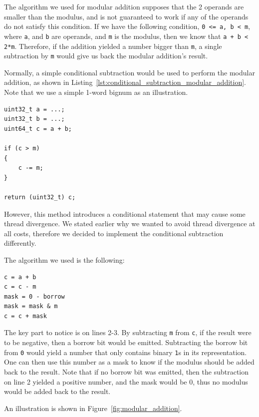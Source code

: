 \documentclass[12pt, a4paper]{report}
\begin{document}
The algorithm we used for modular addition supposes that the 2 operands are
smaller than the modulus, and is not guaranteed to work if any of the operands
do not satisfy this condition.
If we have the following condition, \verb+0 <= a, b < m+, where \verb+a+,
and \verb+b+ are operands, and \verb+m+ is the modulus, then we know that
\verb!a + b < 2*m!.
Therefore, if the addition yielded a number bigger than \verb+m+, a single
subtraction by \verb+m+ would give us back the modular addition's result.

Normally, a simple conditional subtraction would be used to perform the modular
addition, as shown in
Listing~\ref{lst:conditional_subtraction_modular_addition}.
Note that we use a simple 1-word bignum as an illustration.

\begin{lstlisting}
uint32_t a = ...;
uint32_t b = ...;
uint64_t c = a + b;

if (c > m)
{
    c -= m;
}

return (uint32_t) c;
\end{lstlisting}

However, this method introduces a conditional statement that may cause some
thread divergence.
We stated earlier why we wanted to avoid thread divergence at all costs,
therefore we decided to implement the conditional subtraction differently.

The algorithm we used is the following:
\begin{lstlisting}
c = a + b
c = c - m
mask = 0 - borrow
mask = mask & m
c = c + mask
\end{lstlisting}

The key part to notice is on lines 2-3.
By subtracting \verb+m+ from \verb+c+, if the result were to be negative, then
a borrow bit would be emitted.
Subtracting the borrow bit from \verb+0+ would yield a number that only contains
binary \verb+1+s in its representation.
One can then use this number as a mask to know if the modulus should be added
back to the result.
Note that if no borrow bit was emitted, then the subtraction on line 2 yielded a
positive number, and the mask would be 0, thus no modulus would be added back to
the result.

An illustration is shown in Figure~\ref{fig:modular_addition}.
\end{document}
